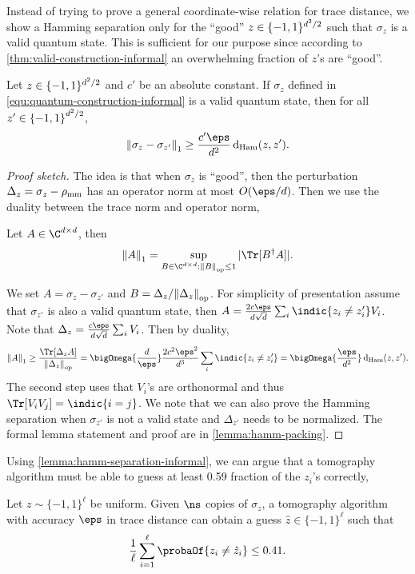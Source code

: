 Instead of trying to prove a general coordinate-wise relation for trace distance, we show a Hamming separation only for the ``good'' $z\in\{-1,1\}^{d^2/2}$ such that $\sigma_z$ is a valid quantum state. 
This is sufficient for our purpose since  according to \cref{thm:valid-construction-informal} an overwhelming fraction of $z$'s are ``good''.
\begin{lemma} \label{lemma:hamm-separation-informal}
   Let $z\in\{-1, 1\}^{d^2/2}$ and $c'$ be an absolute constant. If $\sigma_z$ defined in \eqref{equ:quantum-construction-informal} is a valid quantum state, then for all  $z' \in \left\{-1,1\right\}^{d^2/2}$, 
   \begin{equation}
       \tracenorm{\sigma_z - \sigma_{z'}} \geq \frac{c' \eps}{\dims^2} \ham{z}{z'}.
   \end{equation}
\end{lemma}
\begin{proof}[Proof sketch]
    The idea is that when $\sigma_z$ is ``good'', then the perturbation $\Delta_z=\sigma_z-{\rho_{\text{mm}}}$ has an operator norm at most $O(\eps/\dims)$. Then we use the duality between the trace norm and operator norm,
\begin{lemma} \label{lemma:trace-norm-dual}
    Let $A\in \C^{\dims\times\dims}$, then
    \[
    \tracenorm{A}=\sup_{B\in \C^{\dims\times\dims}:\opnorm{B}\le 1}|\Tr[B^{\dagger}A]|.
    \]
\end{lemma}
We set $A=\sigma_z-\sigma_{z'}$ and $B=\Delta_z/{\left\|\Delta_z\right\|}_{\text{op}}$. For simplicity of presentation assume that $\sigma_{z'}$ is also a valid quantum state, then $A=\frac{2c\eps}{\dims\sqrt{\dims}}\sum_{i}\indic{z_i\ne z_i'}V_i$. Note that $\Delta_z=\frac{c\eps}{\dims\sqrt{\dims}}\sum_{i}V_i$. Then by duality,
\[
\tracenorm{A}\ge \frac{\Tr[\Delta_z A]}{\opnorm{\Delta_z}}=\bigOmega{\frac{\dims}{\eps}}\frac{2c^2\eps^2}{\dims^3}\sum_{i}\indic{z_i\ne z_i'}=\bigOmega{\frac{\eps}{\dims^2}}\ham{z}{z'}.
\]
The second step uses that $V_i$'s are orthonormal and thus $\Tr[V_iV_j]=\indic{i=j}$. 
We note that we can also prove the Hamming separation when $\sigma_{z'}$ is not a valid state and $\Delta_{z'}$ needs to be normalized. The formal lemma statement and proof are in \cref{lemma:hamm-packing}.
\end{proof}

Using \cref{lemma:hamm-separation-informal}, we can argue that a tomography algorithm must be able to guess at least 0.59 fraction of the $z_i$'s correctly,
\begin{proposition}
\label{prop:tomography-guess}
    Let $z\sim \{-1,1\}^{\ell}$ be uniform. Given $\ns$ copies of $\sigma_z$, a tomography algorithm with accuracy $\eps$ in trace distance can obtain a guess $\hat{z}\in \{-1,1\}^{\ell}$ such that
    \[
    \frac{1}{\ell}\sum_{i=1}^\ell\probaOf{z_i\ne\hat{z}_i}\le 0.41.
    \]
\end{proposition}

